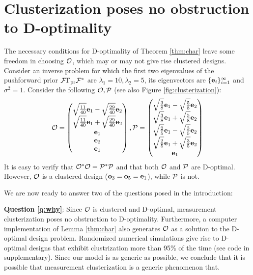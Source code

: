 \section{Clusterization poses no obstruction to D-optimality}\label{section:clusterization}
The necessary conditions for D-optimality of Theorem \ref{thm:char}
leave some freedom in choosing $\mathcal{O}$, which may or may not give rise
clustered designs. Consider an inverse problem for which the first two
eigenvalues of the pushforward prior $\mathcal{F} \Gamma_{\textup{pr}}\mathcal{F}^*$ are
$\lambda_1 = 10, \lambda_2 = 5$, its eigenvectors are
$\{\mathbf{e}_i\}_{i=1}^\infty$ and $\sigma^2=1$. Consider the following
$\mathcal{O}, \mathcal{P}$ (see also Figure \ref{fig:clusterization}):
\begin{equation}\label{eq:two designs}
  \obs =
  \begin{pmatrix}
    \sqrt{\frac{11}{40}}\ev_1 - \sqrt{\frac{29}{40}}\ev_2 \\
    \sqrt{\frac{11}{40}}\ev_1 + \sqrt{\frac{29}{40}}\ev_2 \\
    \ev_1 \\
    \ev_2 \\
    \ev_1 \\    
  \end{pmatrix},
  \pobs =
  \begin{pmatrix}
    \sqrt{\frac{3}{8}}\ev_1 - \sqrt{\frac{5}{8}}\ev_2 \\
    \sqrt{\frac{3}{8}}\ev_1 + \sqrt{\frac{5}{8}}\ev_2 \\
    \sqrt{\frac{2}{5}}\ev_1 - \sqrt{\frac{3}{5}}\ev_2 \\
    \sqrt{\frac{2}{5}}\ev_1 + \sqrt{\frac{3}{5}}\ev_2 \\
    \ev_1 \\    
  \end{pmatrix}
\end{equation}
\noindent It is easy to verify that $\mathcal{O}^*\mathcal{O} = \mathcal{P}^*\mathcal{P}$
and that both $\mathcal{O}$ and $\mathcal{P}$ are D-optimal. However, $\mathcal{O}$
is a clustered design ($\mathbf{o}_3 = \mathbf{o}_5 = \mathbf{e}_1$), while $\mathcal{P}$ is
not.


We are now ready to answer two of the questions posed in the
introduction:

\textbf{Question \ref{q:why}}: Since $\mathcal{O}$ is clustered and
D-optimal, measurement clusterization poses no obstruction to
D-optimality. Furthermore, a computer implementation of Lemma
\ref{thm:char} also generates $\mathcal{O}$ as a solution to the D-optimal
design problem. Randomized numerical simulations give rise to
D-optimal designs that exhibit clustrization more than 95\% of the
time (see code in supplementary). Since our model is as generic as
possible, we conclude that it is possible that measurement
clusterization is a generic phenomenon that.


